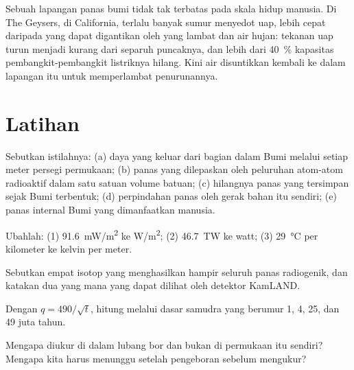 Sebuah lapangan panas bumi tidak tak terbatas pada skala hidup manusia. Di The
Geysers, di California, terlalu banyak sumur menyedot uap, lebih cepat daripada
yang dapat digantikan oleh  yang lambat dan air hujan: tekanan uap
turun menjadi kurang dari separuh puncaknya, dan lebih dari \qty{40}{\percent}
kapasitas pembangkit-pembangkit listriknya hilang. Kini air disuntikkan kembali
ke dalam lapangan itu untuk memperlambat penurunannya.

\section{Latihan}

\begin{exercise}[$\star$]\label{exo:g12:internal-heat:1}
Sebutkan istilahnya: (a) daya yang keluar dari bagian dalam Bumi melalui setiap
meter persegi permukaan; (b) panas yang dilepaskan oleh peluruhan atom-atom
radioaktif dalam satu satuan volume batuan; (c) hilangnya panas yang tersimpan
sejak Bumi terbentuk; (d) perpindahan panas oleh gerak bahan itu sendiri;
(e) panas internal Bumi yang dimanfaatkan manusia.
\end{exercise}

\begin{exercise}[$\star$]\label{exo:g12:internal-heat:2}
Ubahlah: (1) \qty{91.6}{mW/m^2} ke \unit{W/m^2}; (2) \qty{46.7}{TW} ke watt;
(3) \qty{29}{\celsius} per kilometer ke kelvin per meter.
\end{exercise}

\begin{exercise}[$\star$]\label{exo:g12:internal-heat:3}
Sebutkan empat isotop yang menghasilkan hampir seluruh panas radiogenik, dan
katakan dua yang mana yang dapat dilihat oleh detektor KamLAND.
\end{exercise}

\begin{exercise}[$\star$]\label{exo:g12:internal-heat:4}
Dengan $q = 490/\sqrt{t}$, hitung  melalui dasar samudra yang
berumur 1, 4, 25, dan 49 juta tahun.
\end{exercise}

\begin{exercise}[$\star$]\label{exo:g12:internal-heat:5}
Mengapa  diukur di dalam lubang bor dan bukan di permukaan itu
sendiri? Mengapa kita harus menunggu setelah pengeboran sebelum mengukur?
\end{exercise}

